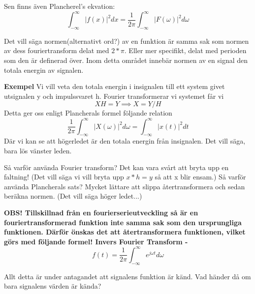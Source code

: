 \documentclass{article}
\begin{document}
Sen finns även Plancherel's ekvation: %
$$\int_{-\infty}^{\infty} |f(x)|^2 dx = \frac{1}{2 \pi}\int_{-\infty}^{\infty} |F(\omega)|^2 d\omega $$ %

Det vill säga normen(alternativt ord?) av en funktion är samma sak som normen av dess fouriertransform delat med $2*\pi$. Eller mer specifikt, delat med perioden som den är definerad över. Inom detta området innebär normen av en signal den totala energin av signalen. %

\textbf{Exempel}
Vi vill veta den totala energin i insignalen till ett system givet utsignalen y och impulssvaret h. Fourier transformerar vi systemet får vi 
$$X H = Y \implies X = Y/H$$
Detta ger oss enligt Plancherals formel följande relation
$$ \frac{1}{2 \pi} \int_{-\infty}^{\infty} |X(\omega)|^2 d \omega = \int_{-\infty}^{\infty} |x(t)|^2 d t $$
Där vi kan se att högerledet är den totala energin från insignalen. 
Det vill säga, bara lös vänster leden. 

Så varför använda Fourier transform? Det kan vara svårt att bryta upp en faltning! (Det vill säga vi vill bryta upp $x*h=y$ så att x blir ensam.)
Så varför använda Plancherals sats? Mycket lättare att slippa återtransformera och sedan beräkna normen. (Det vill säga höger ledet...)

\bf{OBS!} Tillskillnad från en fourierserieutveckling så är en fouriertransformerad funktion \bf{inte} samma sak som den ursprungliga funktionen. Därför önskas det att återtransformera funktionen, vilket görs med följande formel! \newline
Invers Fourier Transform - 
$$f(t) = \frac{1}{2 \pi} \int_{-\infty}^{\infty}  e^{j \omega t} d\omega $$

Allt detta är under antagandet att signalens funktion är känd. Vad händer då om bara signalens värden är kända?

\end{document}
